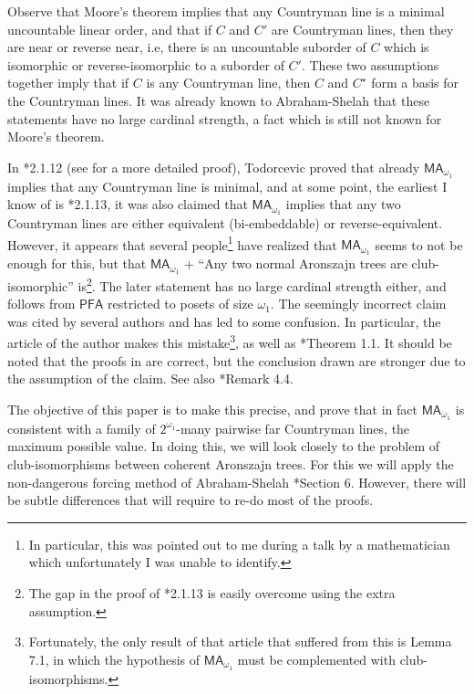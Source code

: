\documentclass[a4paper,noamsfonts]{amsart}
\theoremstyle{definition}
\newcommand{\PFA}{\textsf{PFA}}
\newcommand{\MA}{\textsf{MA}}
\newcommand{\1}{\mathbbm{1}}
\begin{document}
Observe that Moore's theorem implies that any Countryman line is a
minimal uncountable linear order, and that if $C$ and $C'$ are
Countryman lines, then they are near or reverse near, i.e,
there is an uncountable suborder of $C$ which is isomorphic or
reverse-isomorphic to a suborder of $C'$.
These two assumptions together imply that 
if $C$ is any Countryman line, then $C$ and $C^{\star}$
form a basis for the Countryman lines.
It was already known to Abraham-Shelah \cite{ShelahAbraham} that these
statements have no large cardinal strength, a fact which is still not
known for Moore's theorem.

In \cite{TodorcevicWalks}*{2.1.12}
(see \cite{univ-A-line} for a more detailed proof),
Todorcevic proved that
already $\MA_{\omega_{1}}$ implies that any Countryman line
is minimal, and at some point,
the earliest I know of is \cite{TodorcevicWalks}*{2.1.13}, it was
also claimed that $\MA_{\omega_{1}}$ implies that any two Countryman lines
are either equivalent (bi-embeddable) or reverse-equivalent.
However, it appears that several
people\footnote{In particular, this was pointed out to
  me during a talk by a mathematician which unfortunately
  I was unable to identify.}
have realized that $\MA_{\omega_{1}}$ seems to not be enough for this,
but that
$\MA_{\omega_{1}}$ + ``Any two normal Aronszajn trees are club-isomorphic''
is\footnote{The gap in the proof of \cite{TodorcevicWalks}*{2.1.13} is easily
overcome using the extra assumption.}.
The later statement has no large cardinal strength either,
and follows from $\PFA$ restricted to posets of size $\omega_{1}$.
The seemingly incorrect claim was cited by several authors and has
led to some confusion. In particular, the article of the author
\cite{PMREpi} makes this mistake\footnote{Fortunately, the only
  result of that article that suffered from this is
  Lemma 7.1, in which the hypothesis of $\MA_{\omega_{1}}$ must be complemented
  with club-isomorphisms.}, as well as \cite{univ-A-line}*{Theorem 1.1}.
It should be noted that the proofs in \cite{PMREpi,univ-A-line} are correct,
but the conclusion drawn are stronger due to the assumption of the claim.
See also \cite{MooreTodorcevic}*{Remark 4.4}.

The objective of this paper is to make this precise, and prove that in
fact $\MA_{\omega_{1}}$ is consistent with
a family of $2^{\omega_{1}}$-many pairwise far Countryman lines,
the maximum possible value. In
doing this, we will look closely to the problem of club-isomorphisms
between coherent Aronszajn trees.  For this we will apply
the non-dangerous forcing method of Abraham-Shelah
\cite{ShelahAbraham}*{Section 6}. However, there will be subtle differences
that will require to re-do most of the proofs.
\end{document}
